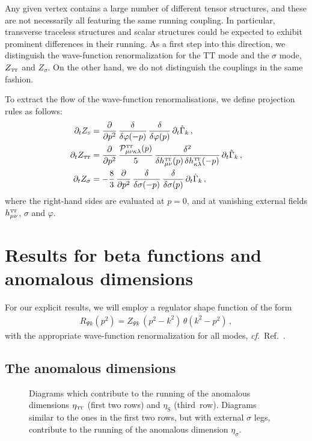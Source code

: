 \documentclass[11pt]{book}
\newcommand\TTspace{ -1pt }
\newcommand\TT{ \scriptscriptstyle{\mathrm{T\hspace{\TTspace}T}} }
\newcommand\hTTmunu{ h^{\scriptscriptstyle{\mathrm{T\hspace{\TTspace}T}}}_{\mu\nu} }
\newcommand\etaTT{ \eta_{\scriptscriptstyle{\mathrm{T\hspace{\TTspace}T}}} }
\newcommand\ZTT{ Z_{\scriptscriptstyle{\mathrm{T\hspace{\TTspace}T}}} }
\newcommand\etaS{ \eta_{\scriptscriptstyle{\mathrm{S}}} }
\newcommand\ZS{ Z_{\scriptscriptstyle{\mathrm{S}}} }
\newcommand\cf{\textit{cf.}\ }
\numberwithin{equation}{chapter}
\begin{document}
Any given vertex contains a large number of different tensor structures,
and these are not necessarily all featuring the same running coupling.
In particular, transverse traceless structures and scalar structures could be expected to exhibit
prominent differences in their running. As a first step into this direction,
we distinguish the wave-function renormalization for the $\mathrm{TT}$ mode and the $\sigma$ mode,
$\ZTT$ and $Z_{\sigma}$. On the other hand, we do not distinguish the couplings in the same fashion.

To extract the flow of the wave-function renormalisations, we define projection rules as follows:
\begin{align}
  \partial_t \ZS &=
  \frac{\partial}{\partial p^2} \, \frac{\delta}{\delta \varphi(-p)} \, \frac{\delta}{\delta \varphi(p)} \, \partial_t \hat \Gamma_k \,, \\
  \partial_t \ZTT &=
  \frac{\partial}{\partial p^2}  \, \frac{\mathcal P^{\TT}_{\mu \nu\kappa\lambda}(p)}{5}
  \, \frac{\delta^2}{\delta \hTTmunu (p) \, \delta h^{\TT}_{\kappa \lambda}(-p)} \, \partial_t \hat \Gamma_k
  \label{eq:projectZTT}\,, \\
  \partial_t Z_{\sigma} &= -\frac{8}{3} \,
  \frac{\partial}{\partial p^2} \, \frac{\delta}{\delta \sigma(-p)} \, \frac{\delta}{\delta \sigma(p)} \, \partial_t \hat \Gamma_k \,,
\end{align}
where the right-hand sides are evaluated at $p=0$,
and at vanishing external fields $\hTTmunu$, $\sigma$ and $\varphi$.


\section{Results for beta functions and anomalous dimensions}

For our explicit results, we will employ a regulator shape function of the form
\begin{align}
  \nonumber
  R_{\Psi k} \left( p^2\right) = Z_{\Psi k} \, (p^2-k^2) \, \theta(k^2-p^2) \,,
\end{align}
with the appropriate wave-function renormalization for all modes, \cf Ref.~\cite{Litim:2001up}.


\subsection{The anomalous dimensions}

\begin{figure}[p]
  \begin{center}
    
  \end{center}
  \caption{
    Diagrams which contribute to the running of the anomalous dimensions
    $\etaTT$ (first two rows) and $\etaS$ (third~row).
    Diagrams similar to the ones in the first two rows, but with external $\sigma$ legs,
    contribute to the running of the anomalous dimension $\eta_{\sigma}$.
  }
  \label{fig:eta-diagrams-ch4}
\end{figure}
\end{document}

